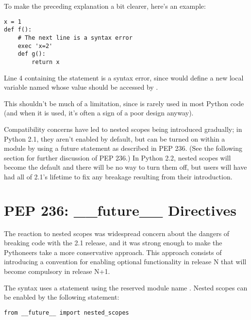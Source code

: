 \documentclass{howto}
\begin{document}
To make the preceding explanation a bit clearer, here's an example:

\begin{verbatim}
x = 1
def f():
    # The next line is a syntax error
    exec 'x=2'  
    def g():
        return x
\end{verbatim}

Line 4 containing the  statement is a syntax error,
since  would define a new local variable named 
whose value should be accessed by .  

This shouldn't be much of a limitation, since  is rarely
used in most Python code (and when it is used, it's often a sign of a
poor design anyway).

Compatibility concerns have led to nested scopes being introduced
gradually; in Python 2.1, they aren't enabled by default, but can be
turned on within a module by using a future statement as described in
PEP 236.  (See the following section for further discussion of PEP
236.)  In Python 2.2, nested scopes will become the default and there
will be no way to turn them off, but users will have had all of 2.1's
lifetime to fix any breakage resulting from their introduction.

\begin{seealso}


\end{seealso}


\section{PEP 236: __future__ Directives}

The reaction to nested scopes was widespread concern about the dangers
of breaking code with the 2.1 release, and it was strong enough to
make the Pythoneers take a more conservative approach.  This approach
consists of introducing a convention for enabling optional
functionality in release N that will become compulsory in release N+1.  

The syntax uses a  statement using the reserved
module name .  Nested scopes can be enabled by the
following statement:

\begin{verbatim}
from __future__ import nested_scopes
\end{verbatim}
\end{document}
